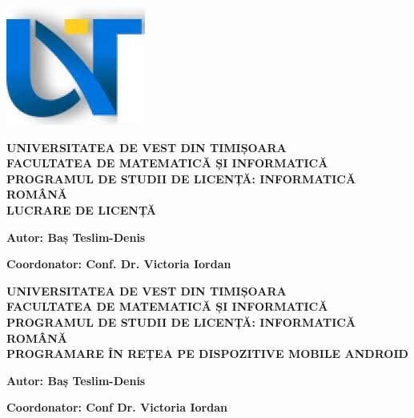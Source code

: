 \documentclass{article}
\begin{document}
	\begin{titlepage}
		\begin{center}
		\vspace*{1cm}
		
		\begin{center}
			\includegraphics[scale=0.6]{Source/UVTLogo}
		\end{center}

		\LARGE
		\textbf{UNIVERSITATEA DE VEST DIN TIMIȘOARA \\ FACULTATEA DE MATEMATICĂ ȘI INFORMATICĂ \\ PROGRAMUL DE STUDII DE LICENȚĂ: INFORMATICĂ ROMÂNĂ}
		\vspace{1cm}\\

		\vfill
		\Large
		\textbf{LUCRARE DE LICENȚĂ}
		\vspace{1cm}
		
		\vfill
		
		\textbf{Autor: Baș Teslim-Denis}
		\vspace{0.1cm}

		\textbf{Coordonator: Conf. Dr. Victoria Iordan}\\
		\vspace{0.1cm}		

		\end{center}
	\end{titlepage}

	\newpage

		\begin{center}
		\vspace*{1cm}

		\LARGE
		\textbf{UNIVERSITATEA DE VEST DIN TIMIȘOARA \\ FACULTATEA DE MATEMATICĂ ȘI INFORMATICĂ \\ PROGRAMUL DE STUDII DE LICENȚĂ: INFORMATICĂ ROMÂNĂ}
		\vspace{1cm}\\

		\vfill
		\Large
		\textbf{PROGRAMARE ÎN REȚEA PE DISPOZITIVE MOBILE ANDROID}
		\vspace{1cm}
		
		\vfill
		
		\textbf{Autor: Baș Teslim-Denis}
		\vspace{0.1cm}

		\textbf{Coordonator: Conf Dr. Victoria Iordan}\\
		\vspace{0.1cm}		

		\end{center}
	\newpage
		
\end{document}
